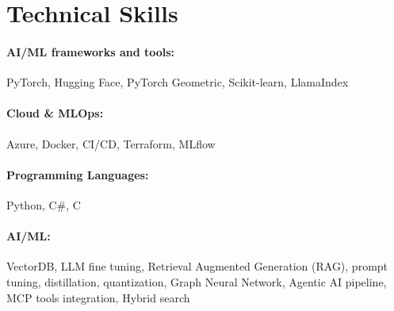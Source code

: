 \documentclass[10pt, letterpaper]{article}
\newenvironment{onecolentry}{
    \begin{adjustwidth}{
        0 cm + 0.00001 cm
    }{
        0 cm + 0.00001 cm
    }
}{
    \end{adjustwidth}
} %
\begin{document}
        




\vspace{-1mm}
\section{Technical Skills}

        \paragraph{AI/ML frameworks and tools:} PyTorch, Hugging Face, PyTorch Geometric, Scikit-learn, LlamaIndex
        \vspace{-4mm}
        \paragraph{Cloud \& MLOps:} Azure, Docker, CI/CD, Terraform, MLflow
        \vspace{-4mm}
        \paragraph{Programming Languages:} Python, C\#, C
        \vspace{-4mm}
        \paragraph{AI/ML:} VectorDB, LLM fine tuning, Retrieval Augmented Generation (RAG), prompt tuning, distillation, quantization, Graph Neural Network, Agentic AI pipeline, MCP tools integration, Hybrid search
\end{document}
